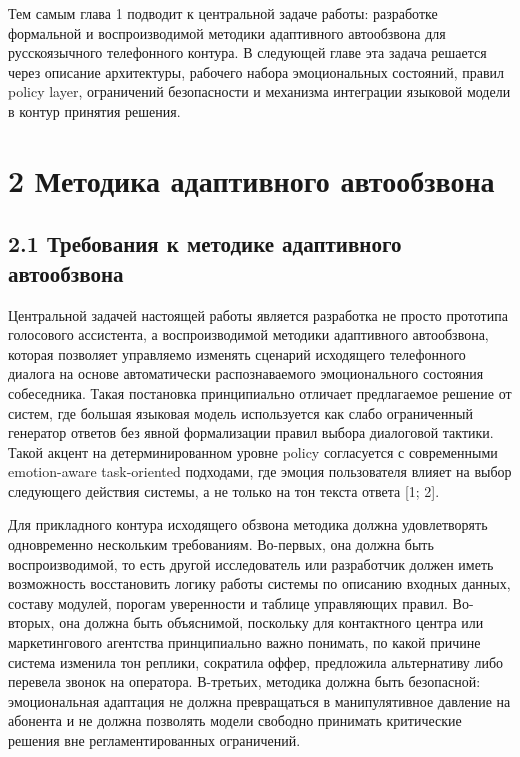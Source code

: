 \documentclass[a4paper,14pt]{extarticle}
\begin{document}
Тем самым глава 1 подводит к центральной задаче работы: разработке
формальной и воспроизводимой методики адаптивного автообзвона для
русскоязычного телефонного контура. В следующей главе эта задача
решается через описание архитектуры, рабочего набора эмоциональных
состояний, правил policy layer, ограничений безопасности и механизма
интеграции языковой модели в контур принятия решения.

\section{2 Методика адаптивного
автообзвона}\label{ux43cux435ux442ux43eux434ux438ux43aux430-ux430ux434ux430ux43fux442ux438ux432ux43dux43eux433ux43e-ux430ux432ux442ux43eux43eux431ux437ux432ux43eux43dux430}

\subsection{2.1 Требования к методике адаптивного
автообзвона}\label{ux442ux440ux435ux431ux43eux432ux430ux43dux438ux44f-ux43a-ux43cux435ux442ux43eux434ux438ux43aux435-ux430ux434ux430ux43fux442ux438ux432ux43dux43eux433ux43e-ux430ux432ux442ux43eux43eux431ux437ux432ux43eux43dux430}

Центральной задачей настоящей работы является разработка не просто
прототипа голосового ассистента, а воспроизводимой методики адаптивного
автообзвона, которая позволяет управляемо изменять сценарий исходящего
телефонного диалога на основе автоматически распознаваемого
эмоционального состояния собеседника. Такая постановка принципиально
отличает предлагаемое решение от систем, где большая языковая модель
используется как слабо ограниченный генератор ответов без явной
формализации правил выбора диалоговой тактики. Такой акцент на
детерминированном уровне policy согласуется с современными emotion-aware
task-oriented подходами, где эмоция пользователя влияет на выбор
следующего действия системы, а не только на тон текста ответа {[}1;
2{]}.

Для прикладного контура исходящего обзвона методика должна удовлетворять
одновременно нескольким требованиям. Во-первых, она должна быть
воспроизводимой, то есть другой исследователь или разработчик должен
иметь возможность восстановить логику работы системы по описанию входных
данных, составу модулей, порогам уверенности и таблице управляющих
правил. Во-вторых, она должна быть объяснимой, поскольку для контактного
центра или маркетингового агентства принципиально важно понимать, по
какой причине система изменила тон реплики, сократила оффер, предложила
альтернативу либо перевела звонок на оператора. В-третьих, методика
должна быть безопасной: эмоциональная адаптация не должна превращаться в
манипулятивное давление на абонента и не должна позволять модели
свободно принимать критические решения вне регламентированных
ограничений.
\end{document}
